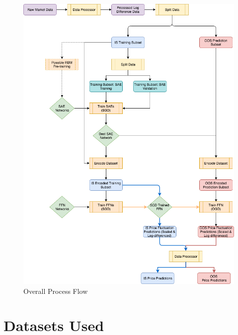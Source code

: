\documentclass[a4paper,11pt,oneside]{article}
\theoremstyle{plain}
\theoremstyle{definition}
\begin{document}
	\begin{figure}[H]
		\centering \includegraphics[scale=0.6]{images/process_implementation/process_flow.png}
		\caption[Overall Process Flow Diagram]{Overall Process Flow}
		\label{figure-proc_diagram}
	\end{figure}
	
	
	
	
	
	
	
	
	
	
	
	
	
	
	
	
	
	
	
	
	
	
	\newpage
	\section{Datasets Used}\label{Datasets}
	
\end{document}
